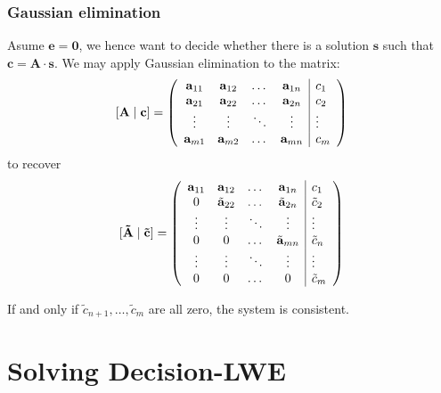 \documentclass[10pt]{beamer}
\renewcommand{\vec}[1]{\mathbf{#1}\xspace}
\begin{document}
\begin{frame}
\frametitle{Gaussian elimination}
Asume $\vec{e} = \vec{0}$, we hence want to decide whether there is a solution $\vec{s}$ such that $\vec{c} = \vec{A}\cdot \vec{s}$. We may apply Gaussian elimination to the matrix:
\[
\vec{[A\mid c]} = \left(\begin{array}{cccc|l}
\bold{a}_{11} & \bold{a}_{12} & \dots & \bold{a}_{1n} & c_1\\
\bold{a}_{21} & \bold{a}_{22} & \dots & \bold{a}_{2n} & c_2\\
\vdots & \vdots & \ddots & \vdots & \vdots\\
\bold{a}_{m1} & \bold{a}_{m2} & \dots & \bold{a}_{mn} & c_m\\
\end{array}\right)
\]
to recover
\[
\vec{[\tilde A\mid \tilde c]} = \left(\begin{array}{cccc|l}
\bold{a}_{11} &        \bold{a}_{12} &  \dots & \bold{a}_{1n}        & c_1\\
            0 & \tilde{\bold{a}}_{22} &  \dots & \tilde{\bold{a}}_{2n} & \tilde c_2\\
       \vdots & \vdots               & \ddots & \vdots               & \vdots\\
            0 &      0               &  \dots & \tilde{\bold{a}}_{mn} & \tilde c_n\\
       \vdots & \vdots               & \ddots & \vdots               & \vdots\\
    0 & 0 & \dots & 0 &\tilde  c_m\\
\end{array}\right)
\]

If and only if $\tilde c_{n+1},\dots,\tilde c_{m}$ are all zero, the system is consistent.
\end{frame}


\section{Solving Decision-LWE}
\end{document}
